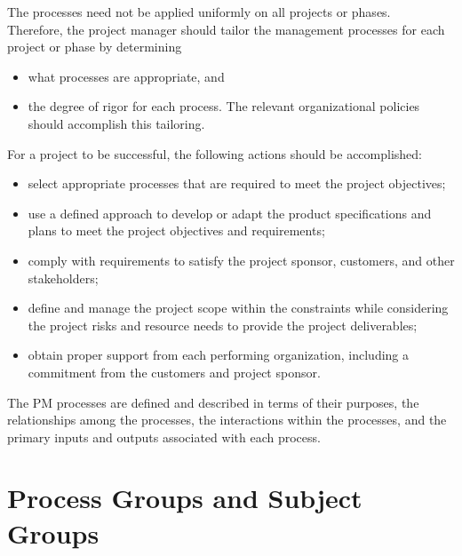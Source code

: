 \documentclass[letterpaper,10pt,english]{jupyterBook}
\begin{document}
\sphinxAtStartPar
The processes need not be applied uniformly on all projects or phases. \\
Therefore, the project manager should tailor the management processes for each project or phase by determining
\begin{itemize}
\item {} 
\sphinxAtStartPar
what processes are appropriate, and

\item {} 
\sphinxAtStartPar
the degree of rigor for each process.
The relevant organizational policies should accomplish this tailoring.

\end{itemize}

\sphinxAtStartPar
For a project to be successful, the following actions should be accomplished:
\begin{itemize}
\item {} 
\sphinxAtStartPar
select appropriate processes that are required to meet the project objectives;

\item {} 
\sphinxAtStartPar
use a defined approach to develop or adapt the product specifications and plans to meet the project objectives and requirements;

\item {} 
\sphinxAtStartPar
comply with requirements to satisfy the project sponsor, customers, and other stakeholders;

\item {} 
\sphinxAtStartPar
define and manage the project scope within the constraints while considering the project risks and resource needs to provide the project deliverables;

\item {} 
\sphinxAtStartPar
obtain proper support from each performing organization, including a commitment from the customers and project sponsor.

\end{itemize}

\sphinxAtStartPar
The PM processes are defined and described in terms of their purposes, the relationships among the processes, the interactions within the processes, and the primary inputs and outputs associated with each process.


\section{Process Groups and Subject Groups}
\label{\detokenize{PM/pm-processes:process-groups-and-subject-groups}}
\end{document}
